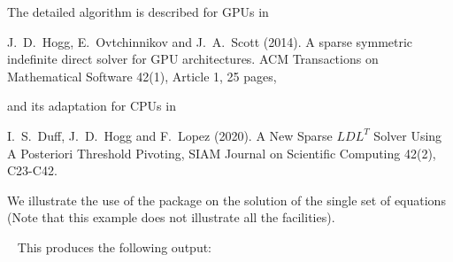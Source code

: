 \documentclass{galahad}
\begin{document}
\noindent
The detailed algorithm is described for GPUs in
\vspace*{1mm}

\noindent
J.\ D.\ Hogg, E.\ Ovtchinnikov and J.\ A.\ Scott (2014).
A sparse symmetric indefinite direct solver for GPU architectures.
ACM Transactions on Mathematical Software 42(1), Article 1, 25 pages,
\vspace*{1mm}

\noindent
and its adaptation for CPUs in

\noindent
I.\ S.\ Duff, J.\ D.\ Hogg and F.\ Lopez (2020).
A New Sparse $LDL^T$ Solver Using A Posteriori Threshold Pivoting,
SIAM Journal on Scientific Computing 42(2), C23-C42.


\galexample
We illustrate the use of the package on the solution of the
single set of equations
(Note that this example does not illustrate all the facilities).

{\tt \small
\VerbatimInput{\packageexample}
}
\noindent
This produces the following output:
{\tt \small
\VerbatimInput{\packageresults}
}
\end{document}
